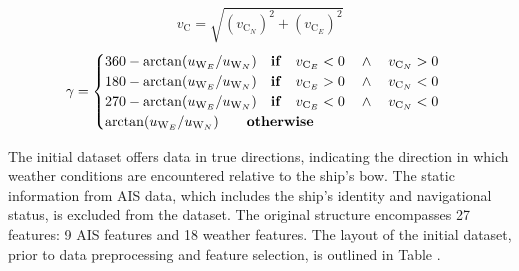 \begin{equation}\label{eqn:vcurrabs}
    v_{\text{C}} = \sqrt{(v_{\text{C}_N})^2 + (v_{\text{C}_E})^2} 
\end{equation}
\begin{equation}\label{eqn:currdir}
    \gamma = 
    \begin{cases}
        360 - \arctan(u_{\text{W}_{E}} / u_{\text{W}_{N}}) \quad \text{\textbf{if}} \quad v_{\text{C}_E} < 0 \quad \wedge \quad v_{\text{C}_N} > 0 \\ 
        180 - \arctan(u_{\text{W}_{E}} / u_{\text{W}_{N}}) \quad \text{\textbf{if}} \quad v_{\text{C}_E} > 0 \quad \wedge \quad v_{\text{C}_N} < 0 \\ 
        270 - \arctan(u_{\text{W}_{E}} / u_{\text{W}_{N}}) \quad \text{\textbf{if}} \quad v_{\text{C}_E} < 0 \quad \wedge \quad v_{\text{C}_N} < 0 \\
        \arctan(u_{\text{W}_{E}} / u_{\text{W}_{N}}) \qquad \text{\textbf{otherwise}} 
    \end{cases}   
\end{equation}

The initial dataset offers data in true directions, indicating the direction in which weather conditions are encountered relative to the ship's bow. The static information from AIS data, which includes the ship's identity and navigational status, is excluded from the dataset. The original structure encompasses 27 features: 9 AIS features and 18 weather features. The layout of the initial dataset, prior to data preprocessing and feature selection, is outlined in Table .

